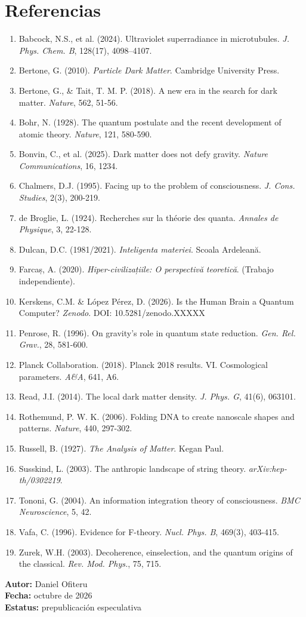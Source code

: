 \section*{Referencias}
\begin{enumerate}
    \item Babcock, N.S., et al. (2024). Ultraviolet superradiance in microtubules. \textit{J. Phys. Chem. B}, 128(17), 4098--4107.
    \item Bertone, G. (2010). \textit{Particle Dark Matter}. Cambridge University Press.
    \item Bertone, G., \& Tait, T. M. P. (2018). A new era in the search for dark matter. \textit{Nature}, 562, 51-56.
    \item Bohr, N. (1928). The quantum postulate and the recent development of atomic theory. \textit{Nature}, 121, 580-590.
    \item Bonvin, C., et al. (2025). Dark matter does not defy gravity. \textit{Nature Communications}, 16, 1234.
    \item Chalmers, D.J. (1995). Facing up to the problem of consciousness. \textit{J. Cons. Studies}, 2(3), 200-219.
    \item de Broglie, L. (1924). Recherches sur la théorie des quanta. \textit{Annales de Physique}, 3, 22-128.
    \item Dulcan, D.C. (1981/2021). \textit{Inteligenta materiei}. Scoala Ardeleană.
    \item Farcaș, A. (2020). \textit{Hiper-civilizațiile: O perspectivă teoretică}. (Trabajo independiente).
    \item Kerskens, C.M. \& López Pérez, D. (2026). Is the Human Brain a Quantum Computer? \textit{Zenodo}. DOI: 10.5281/zenodo.XXXXX
    \item Penrose, R. (1996). On gravity's role in quantum state reduction. \textit{Gen. Rel. Grav.}, 28, 581-600.
    \item Planck Collaboration. (2018). Planck 2018 results. VI. Cosmological parameters. \textit{A\&A}, 641, A6.
    \item Read, J.I. (2014). The local dark matter density. \textit{J. Phys. G}, 41(6), 063101.
    \item Rothemund, P. W. K. (2006). Folding DNA to create nanoscale shapes and patterns. \textit{Nature}, 440, 297-302.
    \item Russell, B. (1927). \textit{The Analysis of Matter}. Kegan Paul.
    \item Susskind, L. (2003). The anthropic landscape of string theory. \textit{arXiv:hep-th/0302219}.
    \item Tononi, G. (2004). An information integration theory of consciousness. \textit{BMC Neuroscience}, 5, 42.
    \item Vafa, C. (1996). Evidence for F-theory. \textit{Nucl. Phys. B}, 469(3), 403-415.
    \item Zurek, W.H. (2003). Decoherence, einselection, and the quantum origins of the classical. \textit{Rev. Mod. Phys.}, 75, 715.
\end{enumerate}

\vspace{1cm}
\begin{flushright}
\textbf{Autor:} Daniel Ofiteru \\
\textbf{Fecha:} octubre de 2026 \\
\textbf{Estatus:} prepublicación especulativa
\end{flushright}


